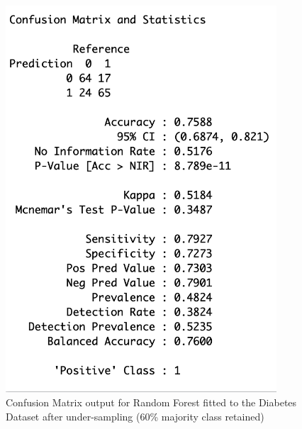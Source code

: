 \begin{figure}[!htbp]
\begin{minipage}{0.45\textwidth}
        \includegraphics[width=0.9\textwidth]{ThesisTemplate/appendix/images/Chapter5Appendix/ConfusionMatrix60/Diabetes.png}
        \caption{Confusion Matrix output for Random Forest fitted to the Diabetes Dataset after under-sampling (60\% majority class retained)}
        \label{fig:my_label}
    \end{minipage}
\end{figure}

